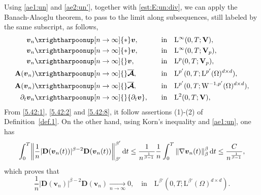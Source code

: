 \documentclass[12pt,reqno]{amsart}
\numberwithin{equation}{section}
\let\originalleft\left
\let\originalright\right
\renewcommand{\left}{\mathopen{}\mathclose\bgroup\originalleft}
\renewcommand{\right}{\aftergroup\egroup\originalright}
\theoremstyle{definition}
\def\1{\Omega}
\def\dt{\,\mathrm{d}t}
\def\W{\mathrm{W}}
\def\L{\mathrm{L}}
\def\vv{\boldsymbol{v}}
\def\bfV{\mathbf{V}}
\def\bfD{\mathbf{D}}
\def\bfA{\mathbf{A}}
\def\bmcA{\boldsymbol{\mathcal{A}}}
\begin{document}
Using \eqref{ae1:un} and \eqref{ae2:un'}, together with \eqref{est:E:un:div}, we can apply the Banach-Alaoglu theorem, to pass to the limit along subsequences, still labeled by the same subscript, as follows,
		\begin{alignat}{2}
			\label{5.42:1}
			\vv_n&\xrightharpoonup[n\to\infty]{\ast} \vv,\quad && \text{in}\quad \L^\infty(0,T;\bfV),  \\
\label{5.42:21}
			\vv_n&\xrightharpoonup[n\to\infty]{\ast} \vv,\quad && \text{in}\quad \L^\infty(0,T;\bfV_p),  \\
			\label{5.42:2}
			\vv_n&\xrightharpoonup[n\to\infty]{} \vv,\quad  &&\text{in}\quad \L^{p}(0,T;\bfV_p),  \\
			\label{5.46}
			\bfA(\vv_n)&\xrightharpoonup[n\to\infty]{} \overline{\bmcA},\quad && \text{in}\quad \L^{p'}(0,T;\L^{p'}(\1)^{d\times d}),
			 \\
			\label{5.47}
			\bfA(\vv_n)&\xrightharpoonup[n\to\infty]{} \overline{\bmcA},\quad  &&\text{in}\quad \L^{p'}(0,T;\W^{-1,p'}(\1)^{d\times d}), \\
\label{5.42:8}
			{\partial_t\vv_{n}}&\xrightharpoonup[n\to\infty]{} {\partial_t\vv},\quad  &&\text{in}\quad \L^{2}(0,T;\bfV),
		\end{alignat}
From \eqref{5.42:1}, \eqref{5.42:2} and \eqref{5.42:8}, it follow assertions (1)-(2) of Definition~\ref{def.1}.
On the other hand, using Korn's inequality and \eqref{ae1:un}, one has
\begin{equation*}
\int_{0}^{T}\left\|\frac{1}{n}|\bfD(\vv_n(t))|^{\beta-2}\bfD(\vv_n(t))\right\|_{\beta'}^{\beta'}\dt\leq
\frac{1}{n^{\frac{1}{\beta-1}}}\frac{1}{n}\int_{0}^{T}\|\nabla\vv_n(t)\|^\beta_{\beta}\dt \leq \frac{C}{n^{\frac{1}{\beta-1}}},
\end{equation*}
which proves that
\begin{equation}\label{5.044}
		\frac{1}{n}|\bfD(\vv_n)|^{\beta-2}\bfD(\vv_n) \xrightarrow[n\to\infty]{} 0,\quad \text{in} \quad \L^{\beta'}(0,T;\L^{\beta'}(\1)^{d\times d}).
\end{equation}
\end{document}
